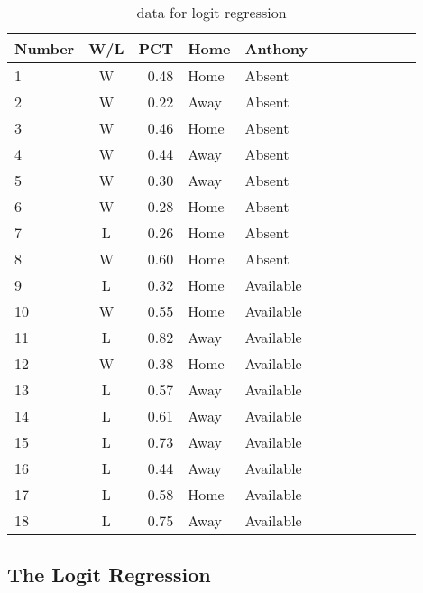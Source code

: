 \documentclass[12pt]{article}
\begin{document}
\begin{table}[ht!]
  \begin{center}
    \begin{tabular}{|l|c|r|l|l|c|l|c|r|l|l|c|}
      \hline
      Number    & W/L & PCT   & Home & Anthony    \\ \hline
      1         & W   & 0.48  & Home & Absent     \\ \hline
      2         & W   & 0.22  & Away & Absent     \\ \hline
      3         & W   & 0.46  & Home & Absent     \\ \hline
      4         & W   & 0.44  & Away & Absent     \\ \hline
      5         & W   & 0.30  & Away & Absent     \\ \hline
      6         & W   & 0.28  & Home & Absent     \\ \hline
      7         & L   & 0.26  & Home & Absent     \\ \hline
      8         & W   & 0.60  & Home & Absent     \\ \hline
      \hline
      9         & L   & 0.32  & Home & Available  \\ \hline
      10        & W   & 0.55  & Home & Available  \\ \hline
      11        & L   & 0.82  & Away & Available  \\ \hline
      12        & W   & 0.38  & Home & Available  \\ \hline
      13        & L   & 0.57  & Away & Available  \\ \hline
      14        & L   & 0.61  & Away & Available  \\ \hline
      15        & L   & 0.73  & Away & Available  \\ \hline
      16        & L   & 0.44  & Away & Available  \\ \hline
      17        & L   & 0.58  & Home & Available  \\ \hline
      18        & L   & 0.75  & Away & Available  \\ \hline
    \end{tabular}
  \end{center}
  \caption{data for logit regression \label{tab:log}}
\end{table}

\subsection{The Logit Regression}
\end{document}
